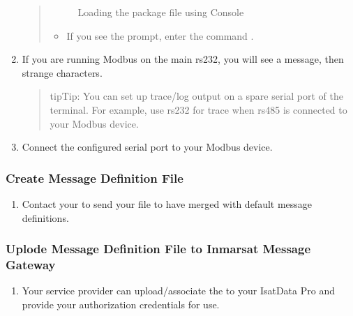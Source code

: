 \documentclass[letterpaper,10pt,english]{sphinxmanual}
\begin{document}
\begin{enumerate}
\begin{quote}
\begin{itemize}
\end{itemize}

\begin{figure}[htbp]
\centering
\capstart

\noindent{}
\caption{Loading the package file using Console}\label{\detokenize{usage:id4}}\end{figure}
\begin{itemize}
\item {} 
If you see the \sphinxcode{\sphinxupquote{\#}} prompt, enter the command .

\end{itemize}
\end{quote}

\item {} 
If you are running Modbus on the main rs232, you will see a  message, then strange characters.
\begin{quote}

\begin{sphinxadmonition}{tip}{Tip:}
You can set up trace/log output on a spare serial port of the terminal.  For example, use rs232 for trace when rs485 is connected to your Modbus device.
\end{sphinxadmonition}
\end{quote}

\item {} 
Connect the configured serial port to your Modbus device.

\end{enumerate}


\subsubsection{Create Message Definition File}
\label{\detokenize{usage:create-message-definition-file}}\begin{enumerate}
\item {} 
Contact your  to send your  file to have merged with default message definitions.

\end{enumerate}


\subsubsection{Uplode Message Definition File to Inmarsat Message Gateway}
\label{\detokenize{usage:uplode-message-definition-file-to-inmarsat-message-gateway}}\begin{enumerate}
\item {} 
Your service provider can upload/associate the  to your IsatData Pro  and provide your authorization credentials for  use.

\end{enumerate}
\end{document}

